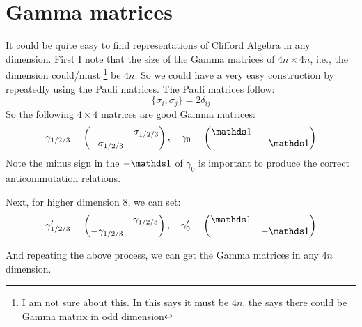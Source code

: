 \documentclass{article}
\begin{document}
\section{Gamma matrices}
\label{sec:Gamma-matrices}

It could be quite easy to find representations of Clifford Algebra in
any dimension. First I note that the size of the Gamma matrices of
$4n\times 4n$, i.e., the dimension could/must
\footnote{I am not sure about this. In this \cite{thePhyStackPage}
    says it must be $4n$, the \cite{theMathematicaPage} says there
could be Gamma matrix in odd dimension} be $4n$. So we could have a
very easy construction by repeatedly using the Pauli matrices. The
Pauli matrices follow:
\begin{equation}
    \{\sigma_i,\sigma_j\} = 2\delta_{ij}
\end{equation}
So the following $4\times 4$ matrices are good Gamma matrices:
\begin{equation}
    \gamma_{1/2/3} = \begin{pmatrix}
                         & \sigma_{1/2/3} \\
        -\sigma_{1/2/3} & \\
    \end{pmatrix},\quad \gamma_0 = \begin{pmatrix}
        \id & \\
           & -\id
    \end{pmatrix}
\end{equation}
Note the minus sign in the $-\id$ of $\gamma_0$ is important to
produce the correct anticommutation relations.

Next, for higher dimension $8$, we can set:
\begin{equation}
    \gamma'_{1/2/3} = \begin{pmatrix}
                         & \gamma_{1/2/3} \\
        -\gamma_{1/2/3} & \\
    \end{pmatrix},\quad \gamma'_0 = \begin{pmatrix}
        \id & \\
           & -\id
    \end{pmatrix}
\end{equation}

And repeating the above process, we can get the Gamma matrices in any
$4n$ dimension.

{}

\end{document}

